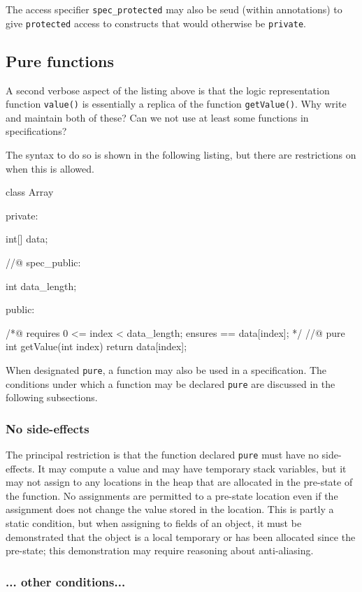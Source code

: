 The access specifier \lstinline|spec_protected| may also be seud (within \NAME{} annotations) to give \lang{} \lstinline|protected| access to \lang{} constructs
that would otherwise be \lstinline|private|.

\subsection{Pure functions}
A second verbose aspect of the listing above is that the logic representation function \lstinline|value()| is essentially a replica of
the \lang{} function \lstinline|getValue()|. Why write and maintain both of these? Can we not use at least some \lang{} functions in 
specifications?

The syntax to do so is shown in the following listing, but there are restrictions on when this is allowed.

\begin{listing-nonumber}
class Array {
	
  private:
	
    int[] data;
	
  //@ spec_public:
	
    int data_length;
	
  public:
	
    /*@ 
      requires 0 <= index < data_length;
      ensures \result == data[index];
    */
    //@ pure
    int getValue(int index) {
		return data[index];
    }	
}
\end{listing-nonumber}

When designated \lstinline|pure|, a \lang{} function may also be used in a \NAME{} specification. The conditions under which a 
\lang{} function may be declared \lstinline|pure| are discussed in the following subsections.

\subsubsection{No side-effects}
The principal restriction is that the function declared \lstinline|pure| must have no side-effects. It may compute a value and may have 
temporary stack variables, but it may not assign to any locations in the heap that are allocated in the pre-state of the function.
No assignments are permitted to a pre-state location even if the assignment does not change the value stored in the location.
This is partly a static condition, but when assigning to fields of an object, it must be demonstrated that the object is a local temporary or
has been allocated since the pre-state; this demonstration may require reasoning about anti-aliasing.


\subsubsection{... other  conditions...}



